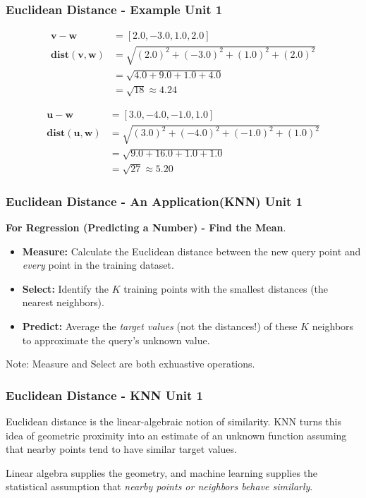 \documentclass[12pt]{beamer}
\newcommand{\FrameTitle}[2]{\frametitle{#1 \hfill \small\textnormal{\textcolor{midgray}{#2}}}}
\newcommand{\vsp}{\vspace*{1em}}
\newcommand{\MVec}[1]{\mathbf{#1}}
\begin{document}
\begin{frame}\FrameTitle{Euclidean Distance - Example}{Unit 1}
    \begin{align*}
        \MVec{v} - \MVec{w} &= [2.0, -3.0, 1.0, 2.0] \\
        \mathbf{dist}(\MVec{v}, \MVec{w}) &= \sqrt{(2.0)^2 + (-3.0)^2 + (1.0)^2 + (2.0)^2} \\
                            &= \sqrt{4.0 + 9.0 + 1.0 + 4.0} \\
                            &= \sqrt{18} \approx 4.24
    \end{align*}

    \begin{align*}
        \MVec{u} - \MVec{w} &= [3.0, -4.0, -1.0, 1.0] \\
        \mathbf{dist}(\MVec{u}, \MVec{w}) &= \sqrt{(3.0)^2 + (-4.0)^2 + (-1.0)^2 + (1.0)^2} \\
                            &= \sqrt{9.0 + 16.0 + 1.0 + 1.0} \\
                            &= \sqrt{27} \approx 5.20
    \end{align*}
\end{frame}

\begin{frame}\FrameTitle{Euclidean Distance - An Application(KNN)}{Unit 1}
    \textbf{For Regression (Predicting a Number) - Find the Mean}.\vsp
    \begin{itemize}
        \item \textbf{Measure:} Calculate the Euclidean distance
            between the new query point and \textit{every} point
            in the training dataset.
        \item \textbf{Select:} Identify the $K$ training points
            with the smallest distances (the nearest neighbors).
        \item \textbf{Predict:} Average the \textit{target values}
            (not the distances!) of these $K$ neighbors to
            approximate the query's unknown value.
    \end{itemize}

    \vsp
    Note: Measure and Select are both exhuastive operations.
    \vfill
\end{frame}

\begin{frame}\FrameTitle{Euclidean Distance - KNN}{Unit 1}
    Euclidean distance is the linear-algebraic notion of similarity.
    KNN turns this idea of geometric proximity into an estimate of
    an unknown function assuming that nearby points tend to have
    similar target values.

    \vspace*{1em}
    Linear algebra supplies the geometry, and machine learning supplies
    the statistical assumption that \emph{nearby points or neighbors
    behave similarly}.
    \vspace*{1em}\vfill
\end{frame}
\end{document}
